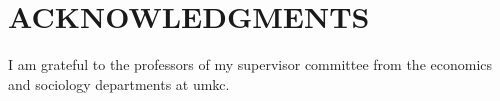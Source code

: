 \section*{\MakeUppercase{Acknowledgments}}


I am grateful to the professors of my supervisor committee from the economics and sociology departments at \ac{umkc}. 

\lipsum[1-2] %
